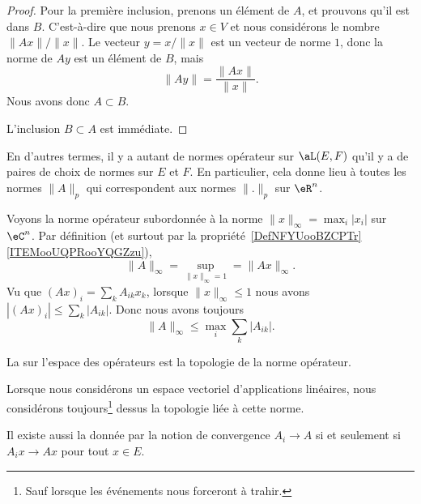 \begin{proof}
    Pour la première inclusion, prenons un élément de \( A\), et prouvons qu'il est dans \( B\). C'est-à-dire que nous prenons \( x\in V\) et nous considérons le nombre \( \| Ax \|/\| x \|\). Le vecteur \( y=x/\| x \|\) est un vecteur de norme $1$, donc la norme de \( Ay\) est un élément de \( B\), mais
    \begin{equation}
        \| Ay \|=\frac{ \| Ax \| }{ \| x \| }.
    \end{equation}
    Nous avons donc \( A\subset B\).

    L'inclusion \( B\subset A\) est immédiate.
\end{proof}

En d'autres termes, il y a autant de normes opérateur sur \( \aL(E,F)\) qu'il y a de paires de choix de normes sur \( E\) et \( F\). En particulier, cela donne lieu à toutes les normes \( \| A \|_p\) qui correspondent aux normes \( \| . \|_p\) sur \( \eR^n\).

\begin{example}     \label{EXooXPXAooYyBwMX}
    Voyons la norme opérateur subordonnée à la norme \( \| x \|_{\infty}=\max_i| x_i |\) sur \( \eC^n\). Par définition (et surtout par la propriété~\ref{DefNFYUooBZCPTr}\ref{ITEMooUQPRooYQGZzu}),
    \begin{equation}
        \| A \|_{\infty}=\sup_{\| x \|_{\infty}=1}=\| Ax \|_{\infty}.
    \end{equation}
    Vu que \( (Ax)_i=\sum_kA_{ik}x_k\), lorsque \( \| x \|_{\infty}\leq 1\) nous avons \( | (Ax)_i |\leq \sum_k| A_{ik} |\). Donc nous avons toujours
    \begin{equation}        \label{EQooPLCIooVghasD}
        \| A \|_{\infty}\leq \max_i\sum_{k}| A_{ik} |.
    \end{equation}
\end{example}

\begin{definition}
    La  sur l'espace des opérateurs est la topologie de la norme opérateur.
\end{definition}
Lorsque nous considérons un espace vectoriel d'applications linéaires, nous considérons toujours\footnote{Sauf lorsque les événements nous forceront à trahir.} dessus la topologie liée à cette norme.

Il existe aussi la  donnée par la notion de convergence \( A_i\to A\) si et seulement si \( A_ix\to Ax\) pour tout \( x\in E\).

